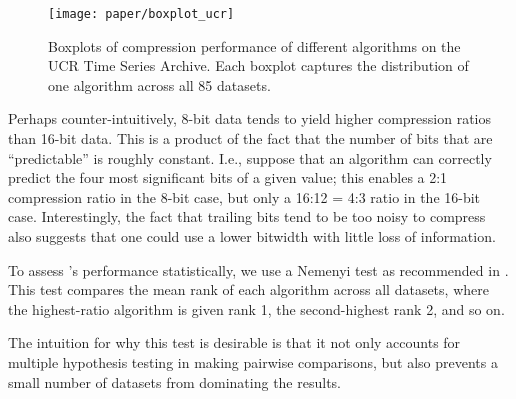 \begin{figure}[h]
\begin{center}
    \texttt{[image: paper/boxplot\_ucr]}
    \caption{Boxplots of compression performance of different algorithms on the UCR Time Series Archive. Each boxplot captures the distribution of one algorithm across all 85 datasets.}
    \label{fig:ratioBox}
\end{center}
\end{figure}

Perhaps counter-intuitively, 8-bit data tends to yield higher compression ratios than 16-bit data. This is a product of the fact that the number of bits that are ``predictable'' is roughly constant. I.e., suppose that an algorithm can correctly predict the four most significant bits of a given value; this enables a 2:1 compression ratio in the 8-bit case, but only a 16:12 = 4:3 ratio in the 16-bit case. Interestingly, the fact that trailing bits tend to be too noisy to compress also suggests that one could use a lower bitwidth with little loss of information. %

To assess \mine's performance statistically, we use a Nemenyi test \cite{nemenyiTest} as recommended in \cite{cdDiagrams}. This test compares the mean rank of each algorithm across all datasets, where the highest-ratio algorithm is given rank 1, the second-highest rank 2, and so on.

The intuition for why this test is desirable is that it not only accounts for multiple hypothesis testing in making pairwise comparisons, but also prevents a small number of datasets from dominating the results.


